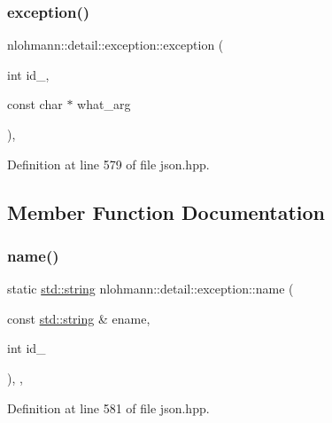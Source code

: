 \subsubsection{\texorpdfstring{exception()}{exception()}}
{\footnotesize\ttfamily nlohmann\+::detail\+::exception\+::exception (\begin{DoxyParamCaption}\item[{int}]{id\+\_\+,  }\item[{const char $\ast$}]{what\+\_\+arg }\end{DoxyParamCaption})\hspace{0.3cm}{\ttfamily [inline]}, {\ttfamily [protected]}}



Definition at line 579 of file json.\+hpp.



\subsection{Member Function Documentation}
\mbox{\label{classnlohmann_1_1detail_1_1exception_abf41a7e9178356314082284e6cfea278}} 
\subsubsection{\texorpdfstring{name()}{name()}}
{\footnotesize\ttfamily static \hyperlink{namespacenlohmann_1_1detail_a1ed8fc6239da25abcaf681d30ace4985ab45cffe084dd3d20d928bee85e7b0f21}{std\+::string} nlohmann\+::detail\+::exception\+::name (\begin{DoxyParamCaption}\item[{const \hyperlink{namespacenlohmann_1_1detail_a1ed8fc6239da25abcaf681d30ace4985ab45cffe084dd3d20d928bee85e7b0f21}{std\+::string} \&}]{ename,  }\item[{int}]{id\+\_\+ }\end{DoxyParamCaption})\hspace{0.3cm}{\ttfamily [inline]}, {\ttfamily [static]}, {\ttfamily [protected]}}



Definition at line 581 of file json.\+hpp.

\mbox{\label{classnlohmann_1_1detail_1_1exception_a0672c25ecdf14d1a071d4d6478a65af0}} 
